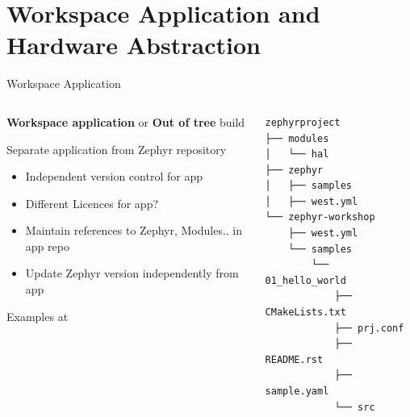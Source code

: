 \documentclass[10pt, aspectratio=169]{beamer}
\begin{document}
\section{Workspace Application and Hardware Abstraction}
\begin{frame}[fragile]{Workspace Application}
  \begin{columns}
    \begin{column}{0.6\textwidth}
      \textbf{Workspace application} or \textbf{Out of tree} build \footnotemark[1]

      Separate application from Zephyr repository
      \begin{itemize}
        \item Independent version control for app
        \item Different Licences for app?
        \item Maintain references to Zephyr, Modules.. in app repo
        \item Update Zephyr version independently from app
      \end{itemize}

      Examples at \footnotemark[2]
    \end{column}
    \begin{column}{0.4\textwidth}
        {\fontsize{7}{7}\selectfont
          \begin{verbatim}
zephyrproject
├── modules
│   └── hal
├── zephyr
│   ├── samples
│   ├── west.yml
└── zephyr-workshop
    ├── west.yml
    └── samples
        └── 01_hello_world
            ├── CMakeLists.txt
            ├── prj.conf
            ├── README.rst
            ├── sample.yaml
            └── src
       \end{verbatim}
        }
    \end{column}
  \end{columns}
\end{frame}
\end{document}
